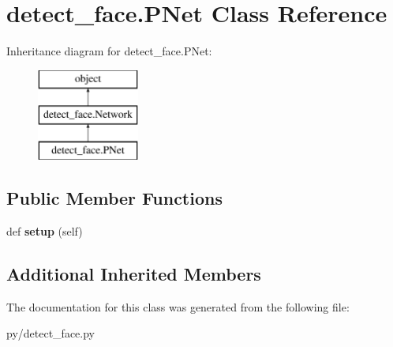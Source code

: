 \hypertarget{classdetect__face_1_1PNet}{}\section{detect\+\_\+face.\+P\+Net Class Reference}
\label{classdetect__face_1_1PNet}
Inheritance diagram for detect\+\_\+face.\+P\+Net\+:\begin{figure}[H]
\begin{center}
\leavevmode
\includegraphics[height=3.000000cm]{classdetect__face_1_1PNet}
\end{center}
\end{figure}
\subsection*{Public Member Functions}
\begin{DoxyCompactItemize}
\item 
def {\bfseries setup} (self)\hypertarget{classdetect__face_1_1PNet_a971a1b62952a9c7c6b926516536f244e}{}\label{classdetect__face_1_1PNet_a971a1b62952a9c7c6b926516536f244e}

\end{DoxyCompactItemize}
\subsection*{Additional Inherited Members}


The documentation for this class was generated from the following file\+:\begin{DoxyCompactItemize}
\item 
py/detect\+\_\+face.\+py\end{DoxyCompactItemize}
